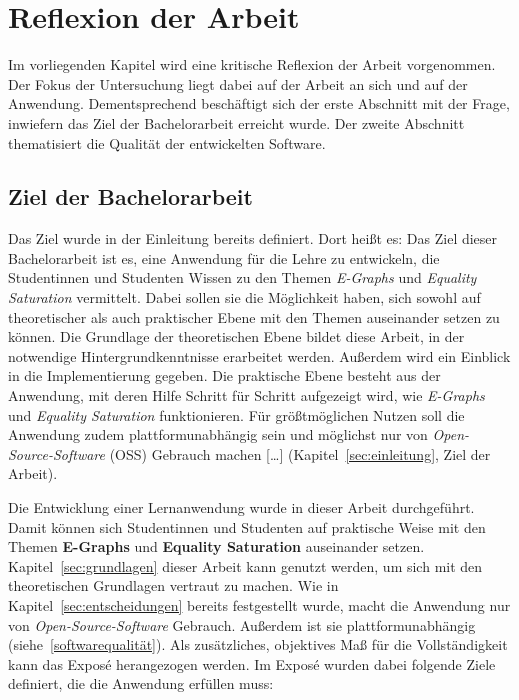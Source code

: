 \section{Reflexion der Arbeit}\label{sec:reflexion}

Im vorliegenden Kapitel wird eine kritische Reflexion der Arbeit vorgenommen. 
Der Fokus der Untersuchung liegt dabei auf der Arbeit an sich und auf der Anwendung.
Dementsprechend beschäftigt sich der erste Abschnitt mit der Frage, inwiefern das Ziel der Bachelorarbeit erreicht wurde.
Der zweite Abschnitt thematisiert die Qualität der entwickelten Software.



\subsection{Ziel der Bachelorarbeit}\label{sub:ziel}

Das Ziel wurde in der Einleitung bereits definiert. Dort heißt es: 
\glqq Das Ziel dieser Bachelorarbeit ist es, eine Anwendung für die Lehre zu entwickeln, die Studentinnen und Studenten Wissen zu den Themen \textit{E-Graphs} und \textit{Equality Saturation}
vermittelt. Dabei sollen sie die Möglichkeit haben, sich sowohl auf theoretischer als auch praktischer Ebene mit den Themen auseinander setzen zu können.
Die Grundlage der theoretischen Ebene bildet diese Arbeit, in der notwendige Hintergrundkenntnisse erarbeitet werden. Außerdem wird ein Einblick in die Implementierung gegeben. 
Die praktische Ebene besteht aus der Anwendung, mit deren Hilfe Schritt für Schritt aufgezeigt wird, wie \textit{E-Graphs} und \textit{Equality Saturation} funktionieren.
Für grö{\ss}tmöglichen Nutzen soll die Anwendung zudem plattformunabhängig sein und möglichst nur von \textit{Open-Source-Software} (OSS) Gebrauch machen [\ldots]\grqq 
(Kapitel~\ref{sec:einleitung}, Ziel der Arbeit).

Die Entwicklung einer Lernanwendung wurde in dieser Arbeit durchgeführt. Damit können sich Studentinnen und Studenten auf praktische Weise mit den Themen 
\textbf{E-Graphs} und \textbf{Equality Saturation} auseinander setzen. Kapitel~\ref{sec:grundlagen} dieser Arbeit kann genutzt werden, um sich mit den
theoretischen Grundlagen vertraut zu machen. 
Wie in Kapitel~\ref{sec:entscheidungen} bereits festgestellt wurde, macht die Anwendung nur von \textit{Open-Source-Software} Gebrauch. Außerdem ist
sie plattformunabhängig (siehe~\ref{softwarequalität}).
Als zusätzliches, objektives Maß für die Vollständigkeit kann das Exposé herangezogen werden.
Im Exposé wurden dabei folgende Ziele definiert, die die Anwendung erfüllen muss:

